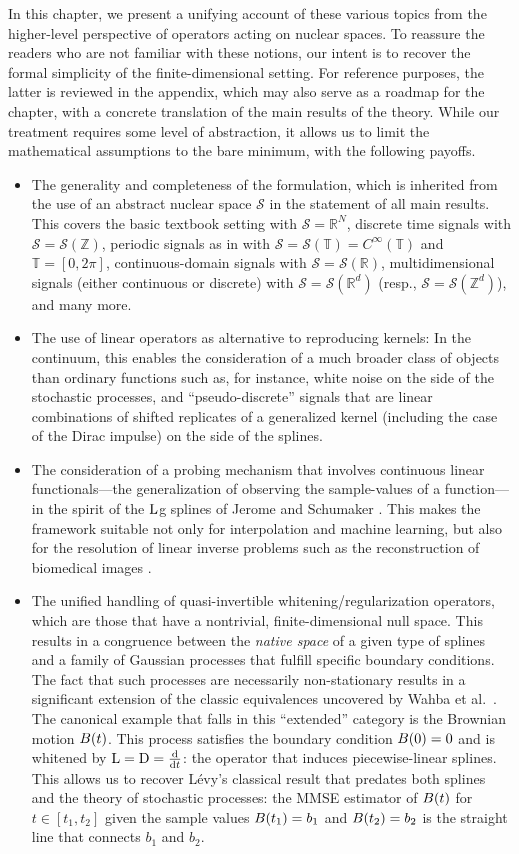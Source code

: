 \documentclass[11pt, english,english]{article}
\newcommand{\R}{ \mathbb{R}}
\newcommand{\Z}{ \mathbb{Z}}
\newcommand{\Lop}{{\rm L}}
\newcommand{\Dop}{{\rm D}}
\newcommand{\dint}{{\rm d}}
\def\Spc#1{{\mathcal{#1}}}  %
\renewcommand{\[}{\begin{equation}}
\renewcommand{\]}[1]{\label{eq:#1}\end{equation}}
\def\Rand#1{{\uppercase{#1}}}         %
\begin{document}
In this chapter, we present
a unifying account of these various topics from the higher-level perspective of operators acting on nuclear spaces.
To reassure the readers who are not familiar with these notions, our intent is to recover the formal simplicity of the finite-dimensional setting. For reference purposes, the latter is reviewed in the appendix, which may also serve as a roadmap for the chapter, with a concrete translation of the main results of the theory.
While our treatment requires some level of abstraction, it allows us to limit the mathematical assumptions to the bare minimum, with the following payoffs. \begin{itemize}
\item The generality and completeness of the formulation, which is inherited from the use of an abstract nuclear space $\Spc S$ in the statement of all main results.
This covers the basic textbook setting with  $\Spc S=\R^N$, discrete time signals with $\Spc S=\Spc S(\Z)$, periodic signals as in \cite{Badoual2018}
with $\Spc S=\Spc S(\mathbb{T})=C^\infty(\mathbb{T})$ and $\mathbb{T}=[0,2\pi]$,
continuous-domain signals with $\Spc S=\Spc S(\R)$, multidimensional signals (either continuous or discrete) with $\Spc S=\Spc S(\R^d)$
(resp., $\Spc S=\Spc S(\Z^d)$), and many more. 
\item The use of linear operators as alternative to reproducing kernels: In the continuum, this enables the consideration of a much broader class of objects than ordinary functions such as, for instance, white noise on the side of the stochastic processes, and ``pseudo-discrete'' signals that are linear combinations of shifted replicates of a generalized kernel (including the case of the Dirac impulse) on the side of the splines.
\item The consideration of a probing mechanism that involves continuous linear functionals---the generalization of observing the sample-values of a function---in the spirit of the $\Lop$g splines of Jerome and Schumaker \cite{Jerome1969}.
This makes the framework suitable not only for interpolation and machine learning, but also for the resolution of linear inverse problems such as the reconstruction of biomedical images \cite{Gupta2018,Unser_2020}.
\item The unified handling of quasi-invertible whitening/regularization operators, which are those that have a nontrivial, finite-dimensional null space. This results in a congruence between the {\em native space} of a given type of splines and a family of Gaussian processes that fulfill specific boundary conditions. The fact that such processes are necessarily non-stationary results in a significant extension of the classic equivalences uncovered by Wahba et al.\ \cite{Kimeldorf1970}. The canonical example that falls in this ``extended'' category is the Brownian motion $\Rand B(t)$. This process satisfies the boundary condition $\Rand B(0)=0$ and is whitened by $\Lop=\Dop=\frac{\dint}{\dint t}$: the operator that induces piecewise-linear splines. This allows us to recover L\'evy's classical result \cite{Levy1934} that predates both splines and the theory of stochastic processes: the MMSE estimator of $\Rand B(t)$ for $t\in[t_1,t_2]$ given the sample values $\Rand B(t_1)=b_1$ and $\Rand B(t_2)=b_2$ is the straight line that connects $b_1$ and $b_2$.

\end{itemize}
\end{document}
